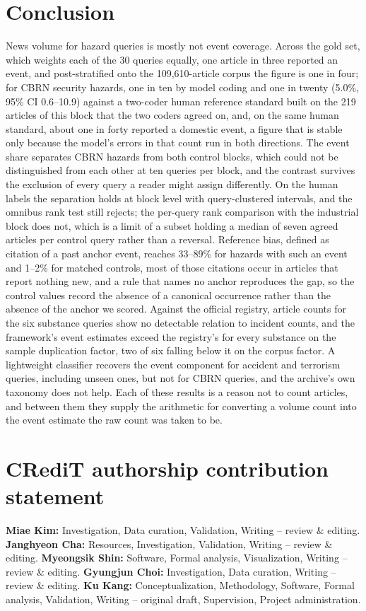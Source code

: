 \documentclass[1p,times]{elsarticle}
\begin{document}
\section{Conclusion}
\label{sec:conclusion}
News volume for hazard queries is mostly not event coverage. Across the gold set, which weights each of the 30 queries equally, one article in three reported an event, and post-stratified onto the 109,610-article corpus the figure is one in four; for CBRN security hazards, one in ten by model coding and one in twenty (5.0\%, 95\% CI 0.6--10.9) against a two-coder human reference standard built on the 219 articles of this block that the two coders agreed on, and, on the same human standard, about one in forty reported a domestic event, a figure that is stable only because the model's errors in that count run in both directions. The event share separates CBRN hazards from both control blocks, which could not be distinguished from each other at ten queries per block, and the contrast survives the exclusion of every query a reader might assign differently. On the human labels the separation holds at block level with query-clustered intervals, and the omnibus rank test still rejects; the per-query rank comparison with the industrial block does not, which is a limit of a subset holding a median of seven agreed articles per control query rather than a reversal. Reference bias, defined as citation of a past anchor event, reaches 33--89\% for hazards with such an event and 1--2\% for matched controls, most of those citations occur in articles that report nothing new, and a rule that names no anchor reproduces the gap, so the control values record the absence of a canonical occurrence rather than the absence of the anchor we scored. Against the official registry, article counts for the six substance queries show no detectable relation to incident counts, and the framework's event estimates exceed the registry's for every substance on the sample duplication factor, two of six falling below it on the corpus factor. A lightweight classifier recovers the event component for accident and terrorism queries, including unseen ones, but not for CBRN queries, and the archive's own taxonomy does not help. Each of these results is a reason not to count articles, and between them they supply the arithmetic for converting a volume count into the event estimate the raw count was taken to be.

\section*{CRediT authorship contribution statement}
\textbf{Miae Kim:} Investigation, Data curation, Validation, Writing -- review \& editing. \textbf{Janghyeon Cha:} Resources, Investigation, Validation, Writing -- review \& editing. \textbf{Myeongsik Shin:} Software, Formal analysis, Visualization, Writing -- review \& editing. \textbf{Gyungjun Choi:} Investigation, Data curation, Writing -- review \& editing. \textbf{Ku Kang:} Conceptualization, Methodology, Software, Formal analysis, Validation, Writing -- original draft, Supervision, Project administration.
\end{document}
